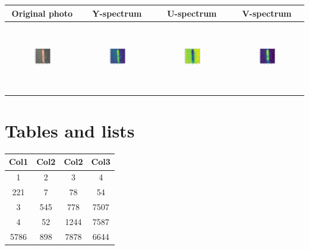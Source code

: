\documentclass[10pt,a4paper]{report}
\theoremstyle{myn}
\theoremstyle{myu}
\begin{document}
\begin{tabular}{c | c c c}
    Original photo & Y-spectrum & U-spectrum & V-spectrum \\ \hline
    \includegraphics[width=0.25\textwidth, height=30mm]{img/yuv1.jpg} & \includegraphics[width=0.25\textwidth, height=30mm]{img/yuv2.jpg} & \includegraphics[width=0.25\textwidth, height=30mm]{img/yuv3.jpg} & \includegraphics[width=0.25\textwidth, height=30mm]{img/yuv4.jpg} \\
\end{tabular}

\clearpage


\section{Tables and lists}

\begin{center}
\begin{tabular}{||c c c c||} 
 \hline
 Col1 & Col2 & Col2 & Col3 \\ [0.5ex] 
 \hline\hline
 1 & 2 & 3 & 4 \\ 
 \hline
 221 & 7 & 78 & 54 \\
 \hline
 3 & 545 & 778 & 7507 \\
 \hline
 4 & 52 & 1244 & 7587 \\
 \hline
 5786 & 898 & 7878 & 6644 \\ [1ex] 
 \hline
\end{tabular}
\end{center}
\end{document}
